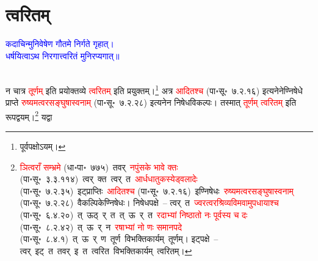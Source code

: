 \section[त्वरितम्]{त्वरितम्}
\centering\textcolor{blue}{कदाचिन्मुनिवेषेण गौतमे निर्गते गृहात्।\nopagebreak\\
धर्षयित्वाऽथ निरगात्त्वरितं मुनिरप्यगात्॥}\nopagebreak\\
\\
\begin{sloppypar}\justifying\noindent\hspace{10mm} न चात्र \textcolor{red}{तूर्णम्} इति प्रयोक्तव्ये \textcolor{red}{त्वरितम्} इति प्रयुक्तम्।\footnote{पूर्वपक्षोऽयम्।}
अत्र \textcolor{red}{आदितश्च} (पा॰सू॰~७.२.१६) इत्यनेनेण्निषेधे प्राप्ते \textcolor{red}{रुष्यमत्वर\-सङ्घुषास्वनाम्} (पा॰सू॰~७.२.२८) इत्यनेन निषेधविकल्पः। तस्मात् \textcolor{red}{तूर्णम्} \textcolor{red}{त्वरितम्} इति रूपद्वयम्।\footnote{\textcolor{red}{ञित्वराँ सम्भ्रमे} (धा॰पा॰~७७५)~\arrow तवर्~\arrow \textcolor{red}{नपुंसके भावे क्तः} (पा॰सू॰~३.३.११४)~\arrow त्वर्~क्त~\arrow त्वर्~त~\arrow \textcolor{red}{आर्धधातुकस्येड्वलादेः} (पा॰सू॰~७.२.३५)~\arrow इट्प्राप्तिः~\arrow \textcolor{red}{आदितश्च} (पा॰सू॰~७.२.१६)~\arrow इण्निषेधः~\arrow \textcolor{red}{रुष्यमत्वर\-सङ्घुषास्वनाम्} (पा॰सू॰~७.२.२८)~\arrow वैकल्पिकेण्निषेधः। निषेधपक्षे~– त्वर्~त~\arrow \textcolor{red}{ज्वरत्वर\-श्रिव्यविम\-वामुपधायाश्च} (पा॰सू॰~६.४.२०)~\arrow त्~ऊठ्~र्~त~\arrow त्~ऊ~र्~त~\arrow \textcolor{red}{रदाभ्यां निष्ठातो नः पूर्वस्य च दः} (पा॰सू॰~८.२.४२)~\arrow त्~ऊ~र्~न~\arrow \textcolor{red}{रषाभ्यां नो णः समानपदे} (पा॰सू॰~८.४.१)~\arrow त्~ऊ~र्~ण~\arrow तूर्ण~\arrow विभक्तिकार्यम्~\arrow तूर्णम्। इट्पक्षे~– त्वर्~इट्~त~\arrow तवर्~इ~त~\arrow त्वरित~\arrow विभक्तिकार्यम्~\arrow त्वरितम्।} यद्वा

\end{sloppypar}
